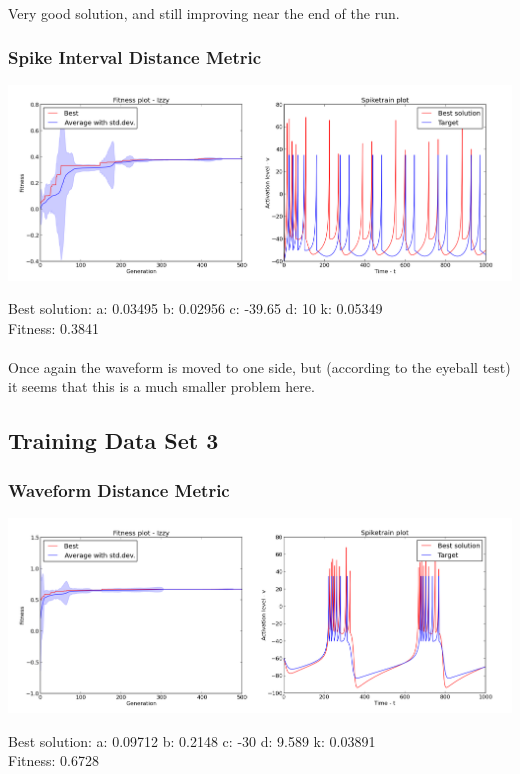 \documentclass[a4paper,12pt]{article}
\begin{document}
\paragraph{}Very good solution, and still improving near the end of the run.

\subsubsection{Spike Interval Distance Metric}
\centerline{\includegraphics[width=1.2\textwidth]{img/case2_int}}
Best solution: 
a: 0.03495 
b: 0.02956 
c: -39.65 
d: 10 
k: 0.05349 \\
Fitness: 0.3841
\paragraph{}Once again the waveform is moved to one side, but (according to the eyeball test) it seems that this is a much smaller problem here.

\subsection{Training Data Set 3}
\subsubsection{Waveform Distance Metric}
\centerline{\includegraphics[width=1.2\textwidth]{img/case3_wave}}
Best solution: 
a: 0.09712 
b: 0.2148 
c: -30 
d: 9.589 
k: 0.03891 \\
Fitness: 0.6728
\end{document}
